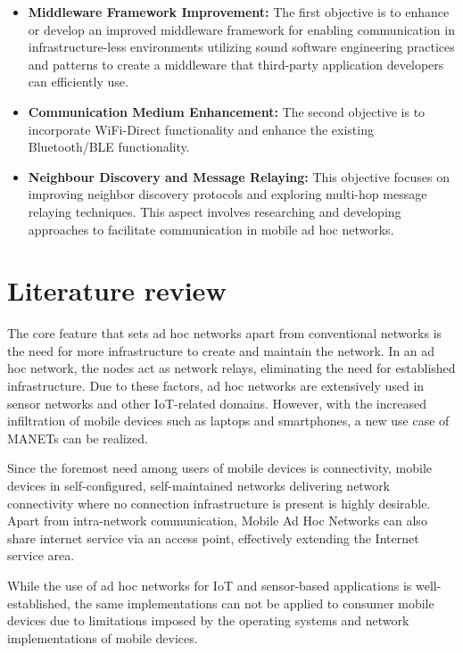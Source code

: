 \documentclass[12pt, conference, onecolumn, a4paper]{IEEEtran}
\begin{document}
\begin{itemize}
    \item \textbf{Middleware Framework Improvement:} The first objective is to
          enhance
          or develop an improved middleware framework for enabling
          communication in
          infrastructure-less environments utilizing sound software engineering
          practices
          and patterns to create a middleware that third-party application
          developers can
          efficiently use.

    \item \textbf{Communication Medium Enhancement:} The second objective is to
          incorporate WiFi-Direct functionality and enhance the existing
          Bluetooth/BLE
          functionality.
    \item \textbf{Neighbour Discovery and Message Relaying:} This objective
          focuses on improving neighbor discovery protocols and exploring
          multi-hop
          message relaying techniques. This aspect involves researching and
          developing
          approaches to facilitate communication in mobile ad hoc networks.

\end{itemize}

\section{Literature review}
The core feature that sets ad hoc networks apart from conventional networks is
the need for more infrastructure to create and maintain the network. In an ad
hoc network, the nodes act as network relays, eliminating the need for
established infrastructure. Due to these factors, ad hoc networks are
extensively used in sensor networks and other IoT-related
domains\cite{akyildiz2002}. However, with the increased infiltration of mobile
devices such as laptops and smartphones, a new use case of MANETs can be
realized.

Since the foremost need among users of mobile devices is
connectivity\cite{chlamtac2003}, mobile devices in self-configured,
self-maintained networks delivering network connectivity where no connection
infrastructure is present is highly desirable\cite{chlamtac2003}. Apart from
intra-network communication, Mobile Ad Hoc Networks can also share internet
service via an access point, effectively extending the Internet service
area\cite{chlamtac2003}.

While the use of ad hoc networks for IoT and sensor-based applications is
well-established, the same implementations can not be applied to consumer
mobile devices due to limitations imposed by the operating systems and network
implementations of mobile devices.
\end{document}
